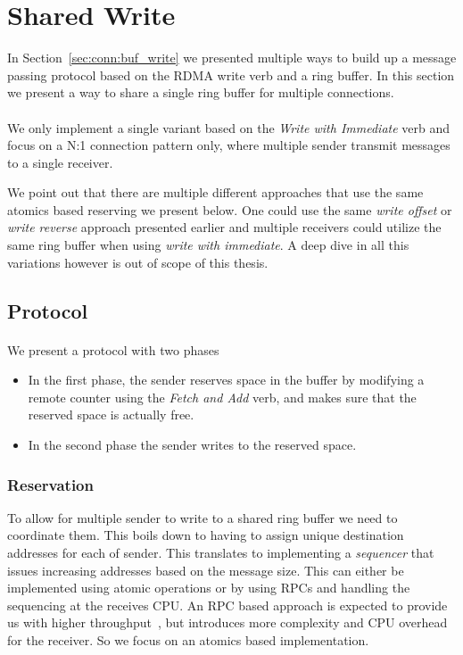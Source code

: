 \section{Shared Write} \label{sec:conn:shared_write}
In Section~\ref{sec:conn:buf_write} we presented multiple ways to build up a message passing protocol based on the 
RDMA write verb and a ring buffer. In this section we present a way to share a single ring buffer for multiple connections.

\paragraph{} We only implement a single variant based on the \emph{Write with Immediate} verb and focus on a N:1 connection pattern only,
where multiple sender transmit messages to a single receiver.

We point out that there are multiple different approaches that use the same atomics based reserving we present below. One
could use the same \emph{write offset} or \emph{write reverse} approach presented earlier and multiple receivers could
utilize the same ring buffer when using \emph{write with immediate}. A deep dive in all this variations however is out
of scope of this thesis.

\subsection{Protocol}

\paragraph{} We present a protocol with two phases

\begin{itemize}
  \item In the first phase, the sender reserves space in the buffer by modifying a remote counter using 
    the \emph{Fetch and Add} verb, and makes sure that the reserved space is actually free.
  \item In the second phase the sender writes to the reserved space.
\end{itemize}
\subsubsection{Reservation}
To allow for multiple sender to write to a shared ring buffer we need to coordinate them. This boils down to having to
assign unique destination addresses for each of sender. This translates to implementing a \emph{sequencer} that issues
increasing addresses based on the message size. This can either be implemented using atomic operations or by using RPCs
and handling the sequencing at the receives CPU. An RPC based approach is expected to provide us with higher 
throughput~\cite{anuj-guide}, but introduces more complexity and CPU overhead for the receiver. So we focus on an atomics based 
implementation.

